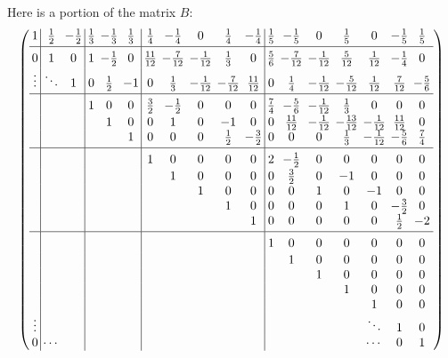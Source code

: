 \documentclass[12pt,dvips]{amsart}
\begin{document}
\par\bigskip
Here is a portion of the matrix $B$:
\[
\left(
\setlength{\arraycolsep}{2pt}%
\def\str{{\vrule height12pt depth5pt width0pt}}%
\begin{array}{c|cc|ccc|ccccc|ccccccc}
 1 & \frac{1}{2} & -\frac{1}{2} & \frac{1}{3} & -\frac{1}{3} & \frac{1}{3} & \frac{1}{4} & -\frac{1}{4} & 0 & \frac{1}{4} & -\frac{1}{4} &   \frac{1}{5} & -\frac{1}{5} & 0 & \frac{1}{5} & 0 & -\frac{1}{5} & \frac{1}{5} \\
[2pt]\hline\str
 0 & 1 & 0 & 1 & -\frac{1}{2} & 0 & \frac{11}{12} & -\frac{7}{12} & -\frac{1}{12} & \frac{1}{3} & 0 & \frac{5}{6} & -\frac{7}{12} &   -\frac{1}{12} & \frac{5}{12} & \frac{1}{12} & -\frac{1}{4} & 0 \\
 \vdots & \ddots & 1 & 0 & \frac{1}{2} & -1 & 0 & \frac{1}{3} & -\frac{1}{12} & -\frac{7}{12} & \frac{11}{12} & 0 & \frac{1}{4} & -\frac{1}{12} &   -\frac{5}{12} & \frac{1}{12} & \frac{7}{12} & -\frac{5}{6} \\
[2pt]\hline\str
   &   &   & 1 & 0 & 0 & \frac{3}{2} & -\frac{1}{2} & 0 & 0 & 0 & \frac{7}{4} & -\frac{5}{6} & -\frac{1}{12} & \frac{1}{3} & 0 & 0 & 0 \\
   &   &   &   & 1 & 0 & 0 & 1 & 0 & -1 & 0 & 0 & \frac{11}{12} & -\frac{1}{12} & -\frac{13}{12} & -\frac{1}{12} & \frac{11}{12} & 0 \\
   &   &   &   &   & 1 & 0 & 0 & 0 & \frac{1}{2} & -\frac{3}{2} & 0 & 0 & 0 & \frac{1}{3} & -\frac{1}{12} & -\frac{5}{6} & \frac{7}{4} \\
[2pt]\hline\str
   &   &   &   &   &   & 1 & 0 & 0 & 0 & 0 & 2 & -\frac{1}{2} & 0 & 0 & 0 & 0 & 0 \\
   &   &   &   &   &   &   & 1 & 0 & 0 & 0 & 0 & \frac{3}{2} & 0 & -1 & 0 & 0 & 0 \\
   &   &   &   &   &   &   &   & 1 & 0 & 0 & 0 & 0 & 1 & 0 & -1 & 0 & 0 \\
   &   &   &   &   &   &   &   &   & 1 & 0 & 0 & 0 & 0 & 1 & 0 & -\frac{3}{2} & 0 \\
   &   &   &   &   &   &   &   &   &   & 1 & 0 & 0 & 0 & 0 & 0 & \frac{1}{2} & -2 \\
[2pt]\hline\str
   &   &   &   &   &   &   &   &   &   &   & 1 & 0 & 0 & 0 & 0 & 0 & 0 \\
   &   &   &   &   &   &   &   &   &   &   &   & 1 & 0 & 0 & 0 & 0 & 0 \\
   &   &   &   &   &   &   &   &   &   &   &   &   & 1 & 0 & 0 & 0 & 0 \\
   &   &   &   &   &   &   &   &   &   &   &   &   &   & 1 & 0 & 0 & 0 \\
   &   &   &   &   &   &   &   &   &   &   &   &   &   &   & 1 & 0 & 0 \\
 \vdots  &   &   &   &   &   &   &   &   &   &   &   &   &   &   & \ddots  & 1 & 0 \\
 0  & \cdots &   &   &   &   &   &   &   &   &   &   &   &   &   & \cdots & 0 & 1
\end{array}
\right)
\]
\end{document}
